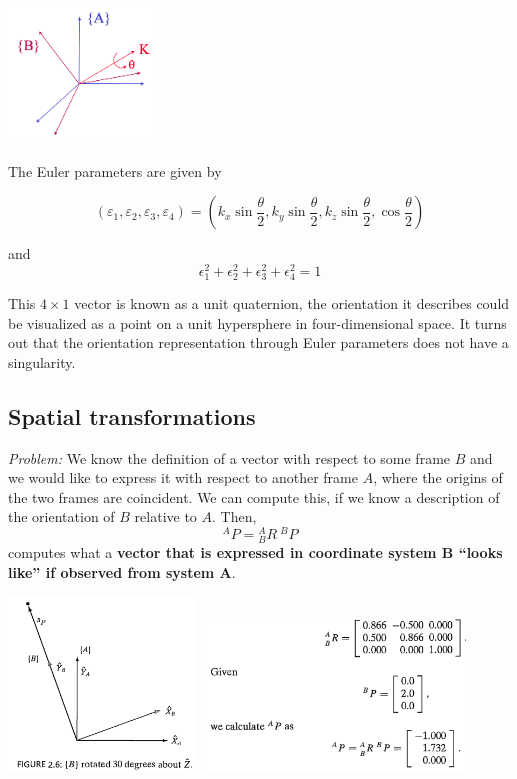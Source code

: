 \begin{center}
	\includegraphics[width=4cm]{sections/imgs/2_equivalent_angle_axis.png}
\end{center}

The Euler parameters are given by

\[ (\varepsilon_1 , \varepsilon_2 , \varepsilon_3 , \varepsilon_4) = ( k_{x} \sin \frac{\theta}{2}, k_{y} \sin \frac{\theta}{2}, k_{z} \sin \frac{\theta}{2}, \cos \frac{\theta}{2})  \]

and 
\[ \epsilon_{1}^{2}+\epsilon_{2}^{2}+\epsilon_{3}^{2}+\epsilon_{4}^{2}=1 \]

This $4 \times 1$ vector is known as a unit quaternion, the orientation it describes could be visualized as a point on a unit hypersphere in four-dimensional space. It turns out that the orientation representation through Euler parameters does not have a singularity.


\subsection{Spatial transformations}
\textit{Problem:} We know the definition of a vector with respect to some frame $B$ and we would like to express it with respect to another frame $A$, where the origins of the two frames are coincident. We can compute this, if we know a description of the orientation of $B$ relative to $A$. Then, \[^{A} P = {^{A}_{B}}R\ {^{B}}P \] computes what a \textbf{vector that is expressed in coordinate system B ``looks like'' if observed from system A}.

\begin{center}
	\includegraphics[width=5cm]{sections/imgs/4.png} 
	\includegraphics[width=7cm]{sections/imgs/5.png}	
\end{center}

